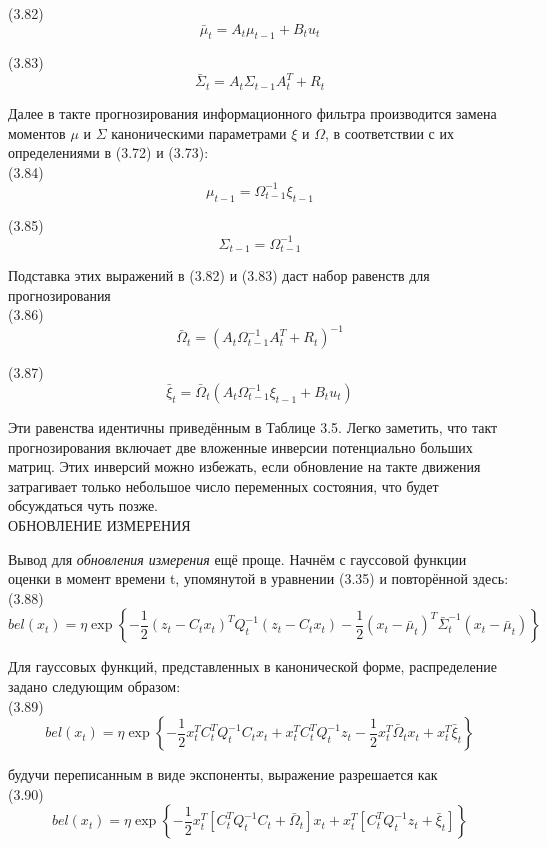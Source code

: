\documentclass[10pt,a4paper]{article}
\begin{document}
(3.82)
$$\bar{\mu}_t=A_t\mu_{t-1}+B_t u_t$$

(3.83)
$$\bar{\varSigma}_t=A_t\varSigma_{t-1}A_t^T+R_t$$

Далее в такте прогнозирования информационного фильтра производится замена моментов $\mu$ и $\varSigma$ каноническими параметрами $\xi$ и $\varOmega$, в соответствии с их определениями в (3.72) и (3.73):\\

(3.84)
$$\mu_{t-1}=\varOmega_{t-1}^{-1}\xi_{t-1}$$

(3.85)
$$\varSigma_{t-1}=\varOmega_{t-1}^{-1}$$

Подставка этих выражений в (3.82) и (3.83) даст набор равенств для прогнозирования\\

(3.86)
$$\bar{\varOmega}_t=(A_t\varOmega_{t-1}^{-1}A_t^T+R_t)^{-1}$$

(3.87)
$$\bar{\xi}_t=\bar{\varOmega}_t(A_t\varOmega_{t-1}^{-1}\xi_{t-1}+B_t u_t)$$
  
Эти равенства идентичны приведённым в Таблице 3.5. Легко заметить, что такт прогнозирования включает две вложенные инверсии потенциально больших матриц. Этих инверсий можно избежать, если обновление на такте движения  затрагивает только небольшое число переменных состояния, что будет обсуждаться чуть позже.\\ 
ОБНОВЛЕНИЕ ИЗМЕРЕНИЯ

Вывод для \textit{обновления измерения} ещё проще. Начнём с гауссовой функции оценки в момент времени t, упомянутой в уравнении (3.35) и повторённой здесь:\\

(3.88)
$$bel(x_t)=\eta\exp\left\lbrace -\frac{1}{2}(z_t-C_t x_t)^T Q_t^{-1}(z_t-C_t x_t)-\frac{1}{2}(x_t-\bar{\mu}_t)^T\bar{\varSigma}_t^{-1}(x_t-\bar{\mu}_t)\right\rbrace $$
 
Для гауссовых функций, представленных в канонической форме, распределение задано следующим образом: \\

(3.89)
$$bel(x_t)=\eta\exp\left\lbrace -\frac{1}{2}x_t^T C_t^T Q_t^{-1}C_t x_t+x_t^T C_t^T Q_t^{-1}z_t-\frac{1}{2}x_t^T\bar{\varOmega}_t x_t+x_t^T\bar{\xi}_t\right\rbrace $$

будучи переписанным в виде экспоненты, выражение разрешается как \\

(3.90)
$$bel(x_t)=\eta\exp\left\lbrace -\frac{1}{2}x_t^T[C_t^T Q_t^{-1}C_t+\bar{\varOmega}_t]x_t+x_t^T[C_t^T Q_t^{-1}z_t+\bar{\xi}_t]\right\rbrace $$
\end{document}
